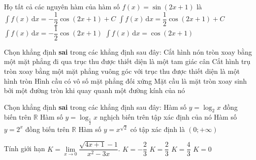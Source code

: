 \begin{ex}%
	Họ tất cả các nguyên hàm của hàm số $f(x)=\sin (2x+1)$ là
	\choice
	{\True $\displaystyle\int f(x)\mathrm{\,d}x=-\dfrac{1}{2}\cos (2x+1)+C$}
	{$\displaystyle\int f(x)\mathrm{\,d}x=\dfrac{1}{2}\cos (2x+1)+C$}
	{$\displaystyle\int f(x)\mathrm{\,d}x=-\dfrac{1}{2}\cos (2x+1)$}
	{$\displaystyle\int f(x)\mathrm{\,d}x=\cos (2x+1)$}
\end{ex}
\begin{ex}%
	Chọn khẳng định \textbf{sai} trong các khẳng định sau đây:
	\choice
	{Cắt hình nón tròn xoay bằng một mặt phẳng đi qua trục thu được thiết diện là một tam giác cân}
	{\True Cắt hình trụ tròn xoay bằng một mặt phẳng vuông góc với trục thu được thiết diện là một hình tròn}
	{Hình cầu có vô số mặt phẳng đối xứng}
	{Mặt cầu là mặt tròn xoay sinh bởi một đường tròn khi quay quanh một đường kính của nó}
\end{ex}
\begin{ex}%
	Chọn khẳng định \textbf{sai} trong các khẳng định sau đây:
	\choice
	{\True Hàm số $y=\log _2x$ đồng biến trên $\mathbb{R}$}
	{Hàm số $y=\log _{\tfrac{1}{2}}x$ nghịch biến trên tập xác định của nó}
	{Hàm số $y=2^x$ đồng biến trên $\mathbb{R}$}
	{Hàm số $y=x^{\sqrt{2}}$ có tập xác định là $(0;+\infty)$}
\end{ex}
\begin{ex}%
	Tính giới hạn $K=\lim\limits_{x\to 0} \dfrac{\sqrt{4x+1}-1}{x^2-3x}$.
	\choice
	{\True $K=-\dfrac{2}{3}$}
	{$K=\dfrac{2}{3}$}
	{$K=\dfrac{4}{3}$}
	{$K=0$}
\end{ex}
